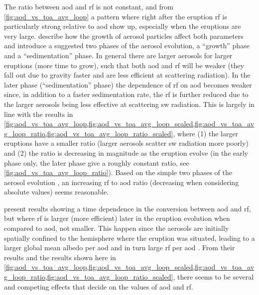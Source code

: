 \documentclass{ametsocV5}
\begin{document}
The ratio between \ac{aod} and \ac{rf} is not constant, and from
\cref{fig:aod_vs_toa_avg_loop} a pattern where right after the eruption \ac{rf} is
particularly strong relative to \ac{aod} show up, especially when the eruptions are very
large. \citet[][see their sections 3.1.2, 3.2.2]{marshall2019} describe how the growth
of aerosol particles affect both parameters and introduce a suggested two phases of the
aerosol evolution, a ``growth'' phase and a ``sedimentation'' phase. In general there
are larger aerosols for larger eruptions (more time to grow), such that both \ac{aod}
and \ac{rf} will be weaker (they fall out due to gravity faster and are less efficient
at scattering radiation).
In the later phase (``sedimentation'' phase) the dependence of \ac{rf} on \ac{aod}
becomes weaker since, in addition to a faster sedimentation rate, the \ac{rf} is further
reduced due to the larger aerosols being less effective at scattering \ac{sw} radiation.
This is largely in line with the results in
\cref{fig:aod_vs_toa_avg_loop,fig:aod_vs_toa_avg_loop_scaled,fig:aod_vs_toa_avg_loop_ratio,fig:aod_vs_toa_avg_loop_ratio_scaled},
where (1) the larger eruptions have a smaller ratio (larger aerosols scatter \ac{sw}
radiation more poorly) and (2) the ratio is decreasing in magnitude as the eruption
evolve (in the early phase only, the later phase give a roughly constant ratio, see
\cref{fig:aod_vs_toa_avg_loop_ratio}). Based on the simple two phases of the aerosol
evolution \citep{marshall2019}, an increasing \ac{rf} to \ac{aod} ratio (decreasing when
considering absolute values) seems reasonable.

\citet[][their figure 1c,d]{marshall2020} present results showing a time dependence in
the conversion between \ac{aod} and \ac{rf}, but where \ac{rf} is larger (more
efficient) later in the eruption evolution when compared to \ac{aod}, not smaller. This
happen since the aerosols are initially spatially confined to the hemisphere where the
eruption was situated, leading to a larger global mean albedo per \ac{aod} and in turn
large \ac{rf} per \ac{aod} \citep{marshall2020}. From their results and the results
shown here in
\cref{fig:aod_vs_toa_avg_loop,fig:aod_vs_toa_avg_loop_scaled,fig:aod_vs_toa_avg_loop_ratio,fig:aod_vs_toa_avg_loop_ratio_scaled},
there seems to be several and competing effects that decide on the values of \ac{aod}
and \ac{rf}.
\end{document}
